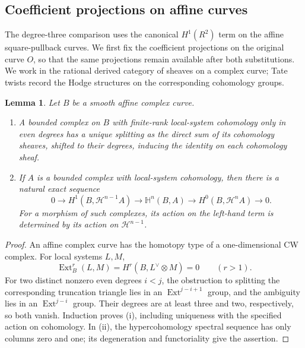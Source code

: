 \documentclass[11pt]{amsart}
\newtheorem{lemma}[theorem]{Lemma}
\theoremstyle{definition}
\theoremstyle{remark}
\numberwithin{equation}{section}
\begin{document}
\subsection{Coefficient projections on affine curves}

The degree-three comparison uses the canonical $H^1(R^2)$ term on
the affine square-pullback curves.  We first fix the coefficient
projections on the original curve $O$, so that the same projections
remain available after both substitutions.  We work in the rational
derived category of sheaves on a complex curve; Tate twists record
the Hodge structures on the corresponding cohomology groups.

\begin{lemma}\label{comp:affine}
Let $B$ be a smooth affine complex curve.
\begin{enumerate}
\item A bounded complex on $B$ with finite-rank local-system cohomology
only in even degrees has a unique splitting as the direct sum of its
cohomology sheaves, shifted to their degrees, inducing the identity on
each cohomology sheaf.
\item If $A$ is a bounded complex with local-system cohomology, then
there is a natural exact sequence
\[
 0\longrightarrow H^1(B,\mathcal H^{n-1}A)
 \longrightarrow \mathbb H^n(B,A)
 \longrightarrow H^0(B,\mathcal H^nA)\longrightarrow0.
\]
For a morphism of such complexes, its action on the left-hand term is
determined by its action on $\mathcal H^{n-1}$.
\end{enumerate}
\end{lemma}

\begin{proof}
An affine complex curve has the homotopy type of a one-dimensional CW
complex.  For local systems $L,M$,
\[
 \operatorname{Ext}^r_B(L,M)
   =H^r(B,L^\vee\otimes M)=0\qquad(r>1).
\]
For two distinct nonzero even degrees $i<j$, the obstruction to splitting
the corresponding truncation triangle lies in an $\operatorname{Ext}^{j-i+1}$
group, and the ambiguity lies in an $\operatorname{Ext}^{j-i}$ group.
Their degrees are at least three and two, respectively, so both vanish.
Induction proves (i), including uniqueness with the specified action on
cohomology.  In (ii), the hypercohomology spectral
sequence has only columns zero and one; its degeneration and functoriality
give the assertion.
\end{proof}
\end{document}
